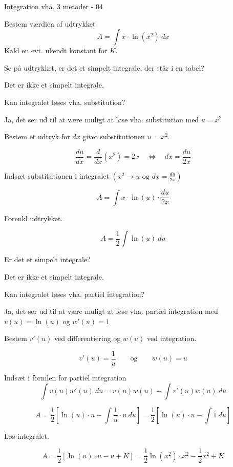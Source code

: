 \documentclass{article}
\begin{document}
\begin{exercise}{Integration vha. 3 metoder - 04}
	
	Bestem værdien af udtrykket
	\[
	A = \int x \cdot \ln(x^2) \ dx
	\]
	Kald en evt. ukendt konstant for $K$.
	
	
	
	\hint
	Se på udtrykket, er det et simpelt integrale, der står i en tabel?
	
	\hint
	Det er ikke et simpelt integrale.
	
	\hint
	Kan integralet løses vha. substitution?
	
	\hint
	Ja, det ser ud til at være muligt at løse vha. substitution med $u=x^2$
	
	\hint
	Bestem et udtryk for $dx$ givet substitutionen $u=x^2$.
	
	\hint
	\[
	\frac{du}{dx} = \frac{d}{dx} \left(x^2 \right) = 2x \quad \Leftrightarrow \quad dx = \frac{du}{2x}
	\]
	
	\hint
	Indsæt substitutionen i integralet $\left(x^2 \rightarrow u \textrm{ og } dx = \frac{du}{2x} \right)$
	
	\hint
	\[
	A =  \int x \cdot \ln(u) \cdot \frac{du}{2x}
	\]
	
	\hint
	Forenkl udtrykket.
	
	\hint
	\[
	A= \frac{1}{2} \int \ln(u) \ du
	\]
	
	\hint
	Er det et simpelt integrale?
	
	\hint
	Det er ikke et simpelt integrale.
	
	\hint
	Kan integralet løses vha. partiel integration?
	
	\hint
	Ja, det ser ud til at være muligt at løse vha. partiel integration med $v(u) = \ln(u)$ og $w'(u) = 1$
	
	\hint
	Bestem $v'(u)$ ved differentiering og $w(u)$ ved integration.
	
	\hint
	\[
	v'(u) = \frac{1}{u} \qquad \textrm{og} \qquad w(u) = u
	\]	
	
	\hint
	Indsæt i formlen for partiel integration
	\[
	 \int v(u) w'(u) \ du = v(u)  w(u) - \int v'(u) w(u) \ du
	\]
	
	\hint
	\[
	A = \frac{1}{2} \left[  \ln(u) \cdot u - \int \frac{1}{u} \cdot u \ du \right] =  \frac{1}{2} \left[ \ln(u) \cdot u - \int 1 \ du \right]
	\]
	
	\hint
	Løs integralet.
	
	\hint
	\[
	A = \frac{1}{2} \left[  \ln(u) \cdot u - u + K \right] = \frac{1}{2} \ln(x^2) \cdot x^2 -  \frac{1}{2} x^2 + K
	\]

	
\end{exercise}
\end{document}
